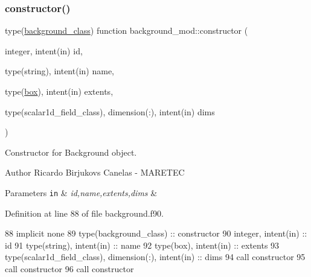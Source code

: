 \subsubsection{\texorpdfstring{constructor()}{constructor()}}
{\footnotesize\ttfamily type(\mbox{\hyperlink{structbackground__mod_1_1background__class}{background\+\_\+class}}) function background\+\_\+mod\+::constructor (\begin{DoxyParamCaption}\item[{integer, intent(in)}]{id,  }\item[{type(string), intent(in)}]{name,  }\item[{type(\mbox{\hyperlink{structgeometry__mod_1_1box}{box}}), intent(in)}]{extents,  }\item[{type(scalar1d\+\_\+field\+\_\+class), dimension(\+:), intent(in)}]{dims }\end{DoxyParamCaption})\hspace{0.3cm}{\ttfamily [private]}}



Constructor for Background object. 

\begin{DoxyAuthor}{Author}
Ricardo Birjukovs Canelas -\/ M\+A\+R\+E\+T\+EC 
\end{DoxyAuthor}

\begin{DoxyParams}[1]{Parameters}
\mbox{\tt in}  & {\em id,name,extents,dims} & \\
\hline
\end{DoxyParams}


Definition at line 88 of file background.\+f90.


\begin{DoxyCode}
88     \textcolor{keywordtype}{implicit none}
89     \textcolor{keywordtype}{type}(background\_class) :: constructor
90     \textcolor{keywordtype}{integer}, \textcolor{keywordtype}{intent(in)} :: id
91     \textcolor{keywordtype}{type}(string), \textcolor{keywordtype}{intent(in)} :: name
92     \textcolor{keywordtype}{type}(box), \textcolor{keywordtype}{intent(in)} :: extents
93     \textcolor{keywordtype}{type}(scalar1d\_field\_class), \textcolor{keywordtype}{dimension(:)}, \textcolor{keywordtype}{intent(in)} :: dims
94     \textcolor{keyword}{call }constructor%
95     \textcolor{keyword}{call }constructor%
96     \textcolor{keyword}{call }constructor%
\end{DoxyCode}
\mbox{\label{namespacebackground__mod_a4e05d8be917e0143fe5889f2b19b750d}} 
